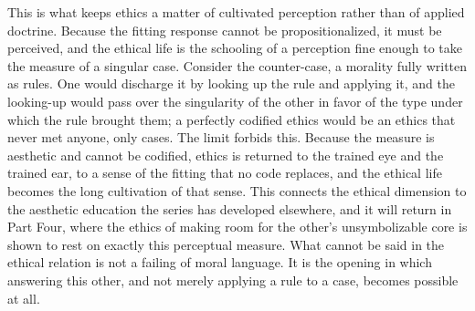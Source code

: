 This is what keeps ethics a matter of cultivated perception rather than of applied doctrine. Because the fitting response cannot be propositionalized, it must be perceived, and the ethical life is the schooling of a perception fine enough to take the measure of a singular case. Consider the counter-case, a morality fully written as rules. One would discharge it by looking up the rule and applying it, and the looking-up would pass over the singularity of the other in favor of the type under which the rule brought them; a perfectly codified ethics would be an ethics that never met anyone, only cases. The limit forbids this. Because the measure is aesthetic and cannot be codified, ethics is returned to the trained eye and the trained ear, to a sense of the fitting that no code replaces, and the ethical life becomes the long cultivation of that sense. This connects the ethical dimension to the aesthetic education the series has developed elsewhere, and it will return in Part Four, where the ethics of making room for the other's unsymbolizable core is shown to rest on exactly this perceptual measure. What cannot be said in the ethical relation is not a failing of moral language. It is the opening in which answering this other, and not merely applying a rule to a case, becomes possible at all.
